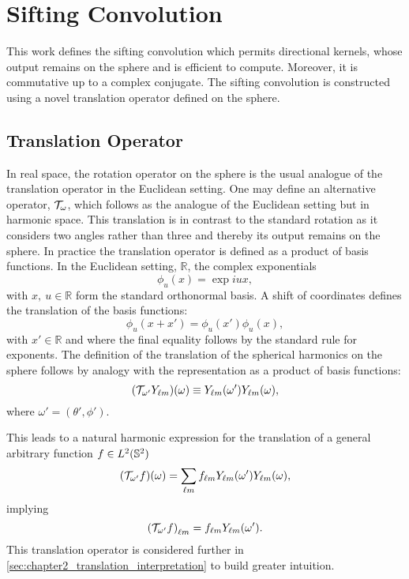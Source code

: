 \section{Sifting Convolution}\label{sec:chapter2_sifting_convolution}

This work defines the sifting convolution which permits directional kernels, whose output remains on the sphere and is efficient to compute.
Moreover, it is commutative up to a complex conjugate.
The sifting convolution is constructed using a novel translation operator defined on the sphere.

\subsection{Translation Operator}\label{sec:chapter2_translation_operator}

In real space, the rotation operator on the sphere is the usual analogue of the translation operator in the Euclidean setting.
One may define an alternative operator, \(\translation{\omega}\), which follows as the analogue of the Euclidean setting but in harmonic space.
This translation is in contrast to the standard rotation as it considers two angles rather than three and thereby its output remains on the sphere.
In practice the translation operator is defined as a product of basis functions.
In the Euclidean setting, \eg{} \(\mathbb{R}\), the complex exponentials
%
\begin{equation}
	\phi_{u}(x) = \exp{iux},
\end{equation}
%
with \(x,\ u \in \mathbb{R}\) form the standard orthonormal basis.
A shift of coordinates defines the translation of the basis functions:
%
\begin{equation}
	\phi_{u}(x + x') = \phi_{u}(x') \phi_{u}(x),
\end{equation}
%
with \(x' \in \mathbb{R}\) and where the final equality follows by the standard rule for exponents.
The definition of the translation of the spherical harmonics on the sphere follows by analogy with the representation as a product of basis functions:
%
\begin{equation}
	\pixel{(\translation{\omega'}\harmonic{Y})} \equiv \pixel[']{\harmonic{Y}} \pixel{\harmonic{Y}},
\end{equation}
%
where \(\omega'=(\theta',\phi')\).

This leads to a natural harmonic expression for the translation of a general arbitrary function \(f \in \hilbert{\twoSphere}\)
%
\begin{equation}\label{eq:chapter2_translation_real}
	\pixel{(\translation{\omega'}f)} = \harmonicSum \harmonic{f} \pixel[']{\harmonic{Y}} \pixel{\harmonic{Y}},
\end{equation}
%
implying
%
\begin{equation}\label{eq:chapter2_translation_harmonic}
	\harmonic{(\translation{\omega'}f)} = \harmonic{f} \pixel[']{\harmonic{Y}}.
\end{equation}
This translation operator is considered further in \cref{sec:chapter2_translation_interpretation} to build greater intuition.

